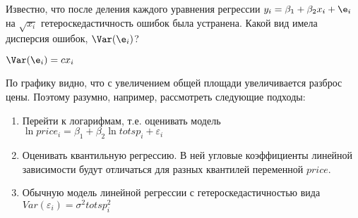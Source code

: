 \documentclass[pdftex,11pt,openany]{book}\usepackage[]{graphicx}\usepackage[]{color}
\makeatletter
\def\maxwidth{ %
  \ifdim\Gin@nat@width>\linewidth
    \linewidth
  \else
    \Gin@nat@width
  \fi
}
\newcommand{\hlstr}[1]{\textcolor[rgb]{0.192,0.494,0.8}{#1}}%
\newcommand{\hlopt}[1]{\textcolor[rgb]{0,0,0}{#1}}%
\newcommand{\hlstd}[1]{\textcolor[rgb]{0.345,0.345,0.345}{#1}}%
\newcommand{\hlkwc}[1]{\textcolor[rgb]{0.333,0.667,0.333}{#1}}%
\newcommand{\hlkwd}[1]{\textcolor[rgb]{0.737,0.353,0.396}{\textbf{#1}}}%
\newenvironment{kframe}{%
 \def\at@end@of@kframe{}%
 \ifinner\ifhmode%
  \def\at@end@of@kframe{\end{minipage}}%
  \begin{minipage}{\columnwidth}%
 \fi\fi%
 \def\FrameCommand##1{\hskip\@totalleftmargin \hskip-\fboxsep
 \colorbox{shadecolor}{##1}\hskip-\fboxsep
     \hskip-\linewidth \hskip-\@totalleftmargin \hskip\columnwidth}%
 \MakeFramed {\advance\hsize-\width
   \@totalleftmargin\z@ \linewidth\hsize
   \@setminipage}}%
 {\par\unskip\endMakeFramed%
 \at@end@of@kframe}
\newenvironment{knitrout}{}{} %
\makeatother
\begin{document}
\begin{problem}
Известно, что после деления каждого уравнения регрессии $y_i = \beta_1 + \beta_2 x_i + \e_i$ на $\sqrt{x_i}$ гетероскедастичность ошибок была устранена. Какой вид имела дисперсия ошибок, $\Var(\e_i)$?
\end{problem}
\begin{solution}
$\Var(\e_i)=c x_i$
\end{solution}




\begin{solution}
По графику видно, что с увеличением общей площади увеличивается разброс цены. Поэтому разумно, например, рассмотреть следующие подходы:
\begin{enumerate}
\item Перейти к логарифмам, т.е. оценивать модель $\ln price_i=\beta_1+\beta_2 \ln totsp_i +\varepsilon_i$
\item Оценивать квантильную регрессию. В ней угловые коэффициенты линейной зависимости будут отличаться для разных квантилей переменной $price$.
\item Обычную модель линейной регрессии с гетероскедастичностью вида $Var(\varepsilon_i)=\sigma^2 totsp_i^2$
\end{enumerate}
\end{solution}
\end{document}
